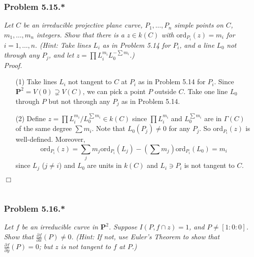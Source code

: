 \documentclass{article}
\begin{document}



\subsubsection*{Problem 5.15.*}
\emph{Let $C$ be an irreducible projective plane curve,
$P_1,\ldots,P_n$ simple points on $C$, $m_1,\ldots,m_n$ integers.
Show that there is a $z \in k(C)$ with $\mathrm{ord}_{P_i}(z) = m_i$ for $i = 1,\ldots,n$.
(Hint: Take lines $L_i$ as in Problem 5.14 for $P_i$,
and a line $L_0$ not through any $P_j$,
and let $z = \prod L_i^{m_i} L_0^{-\sum m_i}$.)} \\



\emph{Proof.}
\begin{enumerate}
\item[(1)]
  Take lines $L_i$ not tangent to $C$ at $P_i$ as in Problem 5.14 for $P_i$.
  Since $\mathbf{P}^2 = V(0) \supsetneq V(C)$, we can pick a point $P$ outside $C$.
  Take one line $L_0$ through $P$ but not through any $P_j$ as in Problem 5.14.

\item[(2)]
  Define $z = \prod L_i^{m_i} / L_0^{\sum m_i} \in k(C)$ since
  $\prod L_i^{m_i}$ and $L_0^{\sum m_i}$ are in $\Gamma(C)$
  of the same degree $\sum m_i$.
  Note that $L_0(P_j) \neq 0$ for any $P_j$.
  So $\mathrm{ord}_{P_i}(z)$ is well-defined.
  Moreover,
  \[
    \mathrm{ord}_{P_i}(z)
    = \sum_j m_j \mathrm{ord}_{P_i}(L_j) - \left( \sum m_j \right) \mathrm{ord}_{P_i}(L_0)
    = m_i
  \]
  since $L_j$ ($j \neq i$) and $L_0$ are units in $k(C)$ and
  $L_i \ni P_i$ is not tangent to $C$.
\end{enumerate}
$\Box$ \\\\






\subsubsection*{Problem 5.16.*}
\emph{Let $f$ be an irreducible curve in $\mathbf{P}^2$.
Suppose $I(P, f \cap z) = 1$, and $P \neq [1:0:0]$.
Show that $\frac{\partial f}{\partial x}(P) \neq 0$.
(Hint: If not, use Euler's Theorem to show that $\frac{\partial f}{\partial y}(P) = 0$;
but $z$ is not tangent to $f$ at $P$.)} \\
\end{document}
